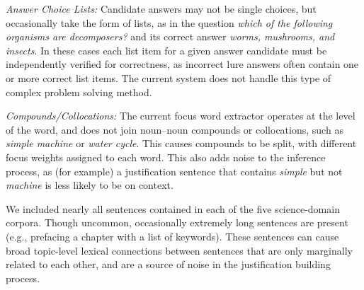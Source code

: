 {\flushleft \emph{Answer Choice Lists: }}
Candidate answers may not be single choices, but occasionally take the form of lists, as in the question \emph{which of the following organisms are decomposers?} and its correct answer \emph{worms, mushrooms, and insects}.  In these cases each list item for a given answer candidate must be independently verified for correctness, as incorrect lure answers often contain one or more correct list items.  The current system does not handle this type of complex problem solving method. 

{\flushleft \emph{Compounds/Collocations: }}
The current focus word extractor operates at the level of the word, and does not join noun--noun compounds or collocations, such as \emph{simple machine} or \emph{water cycle}.  This causes compounds to be split, with different focus weights assigned to each word.  This also adds noise to the inference process, as (for example) a justification sentence that contains \emph{simple} but not \emph{machine} is less likely to be on context. 
  

{}
We included nearly all sentences contained in each of the five science-domain corpora.  Though uncommon, occasionally extremely long sentences are present (e.g., prefacing a chapter with a list of keywords).  These sentences can cause broad topic-level lexical connections between sentences that are only marginally related to each other, and are a source of noise in the justification building process.  



 
